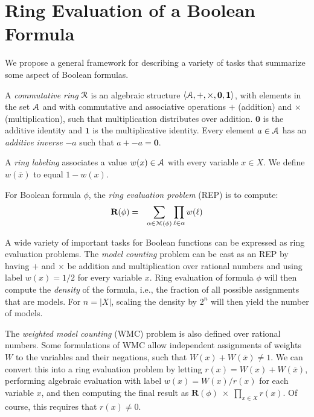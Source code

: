 \documentclass[letterpaper,USenglish,cleveref, autoref, thm-restate]{lipics-v2021}
\newcommand{\obar}[1]{\overline{#1}}
\newcommand{\lit}{\ell}
\newcommand{\varset}{X}
\newcommand{\ring}{{\cal R}}
\newcommand{\dset}{{\cal A}}
\newcommand{\rep}{\textbf{R}}
\newcommand{\radd}{+}
\newcommand{\rmul}{\times}
\newcommand{\addident}{\textbf{0}}
\newcommand{\mulident}{\textbf{1}}
\newcommand{\modelset}{{\cal M}}
\begin{document}
  \section{Ring Evaluation of a Boolean Formula}

We propose a general framework for describing a variety of tasks that
summarize some aspect of Boolean formulas.

\begin{definition}
  A {\em commutative ring} $\ring$ is an algebraic structure
  $\langle \dset, \radd, \rmul, \addident, \mulident \rangle$, 
  with elements in the set $\dset$ and with commutative and
  associative operations $\radd$ (addition) and $\rmul$ (multiplication),
  such that multiplication distributes
  over addition.  $\addident$ is the additive identity and $\mulident$ is
  the multiplicative identity.  Every element $a \in \dset$ has an
  {\em additive inverse} $-a$ such that $a + -a = \addident$.
\label{def:ring}
\end{definition}

\begin{definition}
  A {\em ring labeling} associates a value $w(x) \in \dset$ with
  every variable $x \in \varset$.  We define $w(\obar{x})$ to equal $1-w(x)$.

  For Boolean formula $\phi$, the {\em ring evaluation problem} (REP) is to compute:
  \begin{eqnarray}
    \rep(\phi) & = & \sum_{\alpha \in \modelset(\phi)} \prod_{\lit \in \alpha} w(\ell) \label{eqn:rep}
  \end{eqnarray}
\label{def:labeling}
\end{definition}

A wide variety of important tasks for Boolean functions can be
expressed as ring evaluation problems.  The 
{\em model counting} problem can be cast as an REP by having $\radd$ and
$\rmul$ be addition and multiplication over rational numbers and using
label $w(x) = 1/2$ for every variable $x$.  
Ring evaluation of formula $\phi$ will then compute the {\em density} of
the formula, i.e., the fraction of all possible assignments that are
models.  For $n = |\varset|$, scaling the density by $2^n$ will then
yield the number of models.

The {\em weighted model counting} (WMC) problem is also defined over
rational numbers.  Some formulations of WMC allow independent
assignments of weights $W$ to the variables and their negations, such
that $W(x) + W(\obar{x}) \not = 1$.  We can convert this into a
ring evaluation problem by letting $r(x) = W(x) + W(\obar{x})$,
performing algebraic evaluation with label $w(x) = W(x)/r(x)$ for each
variable $x$, and then computing the final result as $\rep(\phi)\;
\rmul\; \prod_{x \in \varset} r(x)$.  Of course, this requires that $r(x) \not = 0$.
\end{document}
